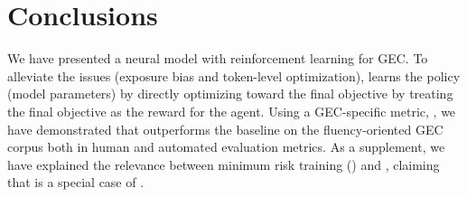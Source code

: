 \section{Conclusions}
\label{sec:conclusions}
\vspace{-2mm}
We have presented a neural \encdec model with reinforcement learning for GEC. 
To alleviate the \mle issues (exposure bias and token-level optimization), \proposed learns the policy (model parameters) by directly optimizing toward the final objective by treating the final objective as the reward for the \encdec agent.
Using a GEC-specific metric, \metric, we have demonstrated that \proposed outperforms the \mle baseline on the fluency-oriented GEC corpus both in human and automated evaluation metrics.
As a supplement, we have explained the relevance between minimum risk training (\mrt) and \proposed, claiming that \mrt is a special case of \proposed.